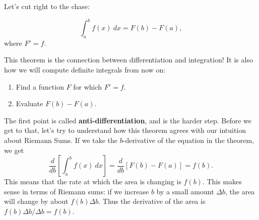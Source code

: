 Let's cut right to the chase:

\begin{thm}
    $$\int_a^bf(x)\ dx = F(b)-F(a),$$
    where $F'=f$.
\end{thm}

This theorem is the connection between differentiation and integration! It is also how we will compute definite integrals from now on:
\begin{enumerate}
    \item Find a function $F$ for which $F'=f$.
    \item Evaluate $F(b)-F(a).$
\end{enumerate}

The first point is called \textbf{anti-differentiation}, and is the harder step. Before we get to that, let's try to understand how this theorem agrees with our intuition about Riemann Sums. If we take the $b$-derivative of the equation in the theorem, we get
$$\frac{d}{db}\left[\int_a^{b}f(x)\ dx\right] = \frac{d}{db}\left[F(b)-F(a)\right] = f(b).$$
This means that the rate at which the area is changing is $f(b)$. This makes sense in terms of Riemann sums: if we increase $b$ by a small amount $\Delta b$, the area will change by about $f(b) \Delta b$. Thus the derivative of the area is $f(b)\Delta b/\Delta b = f(b)$. 













